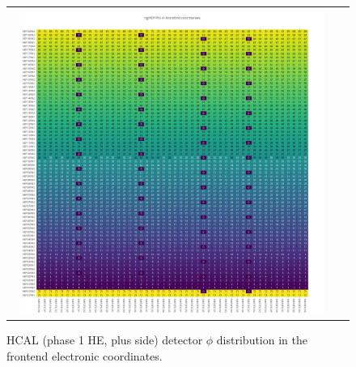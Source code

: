 \clearpage
\begin{figure}[htb]
 \begin{center}
  \begin{tabular}{cc}
   \includegraphics[angle=0,width=0.95\textwidth]{figures/appendix/ngHEP_Phi_in_FrontEnd.png}
  \end{tabular}
	\caption{HCAL (phase 1 HE, plus side) detector $\phi$ distribution in the frontend electronic coordinates.}
  \label{fig:lmapngHEPPhiFEC}
 \end{center}
\end{figure}

